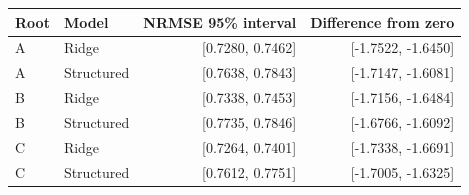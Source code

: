 \footnotesize\setlength{\tabcolsep}{3pt}\begin{tabular*}{\columnwidth}{@{\extracolsep{\fill}}llrr}
\toprule
Root & Model & NRMSE 95\% interval & Difference from zero \\
\midrule
A & Ridge & [0.7280, 0.7462] & [-1.7522, -1.6450] \\
A & Structured & [0.7638, 0.7843] & [-1.7147, -1.6081] \\
B & Ridge & [0.7338, 0.7453] & [-1.7156, -1.6484] \\
B & Structured & [0.7735, 0.7846] & [-1.6766, -1.6092] \\
C & Ridge & [0.7264, 0.7401] & [-1.7338, -1.6691] \\
C & Structured & [0.7612, 0.7751] & [-1.7005, -1.6325] \\
\bottomrule
\end{tabular*}
